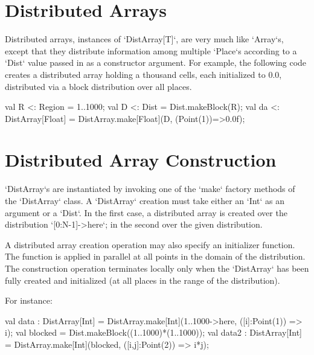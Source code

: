 \section{Distributed Arrays}

Distributed arrays, instances of \xcd`DistArray[T]`, are very much like
\xcd`Array`s, except that they distribute information among multiple
\xcd`Place`s according to a \xcd`Dist` value passed in as a constructor
argument.  For example, the following code creates a distributed array holding
a thousand cells, each initialized to 0.0, distributed via a block
distribution over all places.
\begin{xten}
val R <: Region = 1..1000;
val D <: Dist = Dist.makeBlock(R);
val da <: DistArray[Float] = DistArray.make[Float](D, (Point(1))=>0.0f);
\end{xten}




\section{Distributed Array Construction}\label{ArrayInitializer}

\xcd`DistArray`s are instantiated by invoking one of the \xcd`make` factory
methods of the \xcd`DistArray` class.
A \xcd`DistArray` creation 
must take either an \xcd`Int` as an argument or a \xcd`Dist`. In the first
case,  a distributed array is created over the distribution \xcd`[0:N-1]->here`;
in the second over the given distribution. 

A distributed array creation operation may also specify an initializer
function.
The function is applied in parallel
at all points in the domain of the distribution. The
construction operation terminates locally only when the \xcd`DistArray` has been
fully created and initialized (at all places in the range of the
distribution).

For instance:
\begin{xten}
val data : DistArray[Int]
    = DistArray.make[Int](1..1000->here, ([i]:Point(1)) => i);
val blocked = Dist.makeBlock((1..1000)*(1..1000));
val data2 : DistArray[Int]
    = DistArray.make[Int](blocked, ([i,j]:Point(2)) => i*j);
\end{xten}


